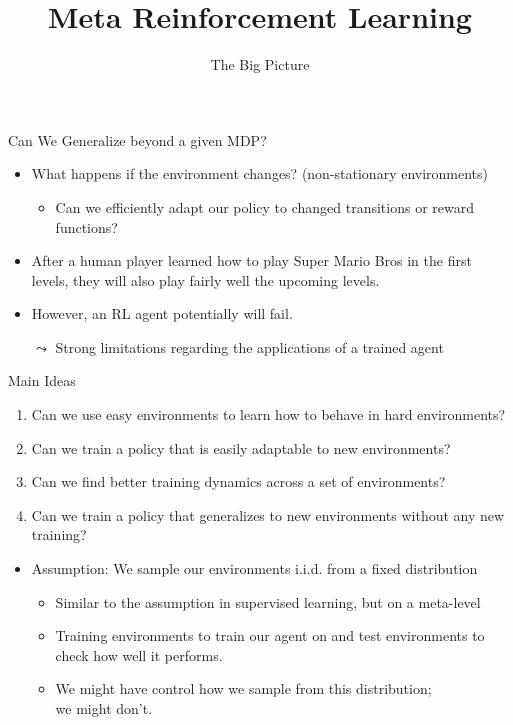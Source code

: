 \documentclass[aspectratio=169]{../latex_main/tntbeamer}  %
\title[Meta-RL]{Meta Reinforcement Learning}
\subtitle{The Big Picture}
\begin{document}
	
	\maketitle

\begin{frame}[c]{Can We Generalize beyond a given MDP?}
	
	\begin{itemize}
		\item What happens if the environment changes? (non-stationary environments)
		\begin{itemize}
			\item Can we efficiently adapt our policy to changed transitions or reward functions?
		\end{itemize}
		\smallskip
		\item After a human player learned how to play Super Mario Bros in the first levels, they will also play fairly well the upcoming levels.
		\item However, an RL agent potentially will fail.
		\item[$\leadsto$] Strong limitations regarding the applications of a trained agent
	\end{itemize}
	
\end{frame}
\begin{frame}[c]{Main Ideas}
	
	\begin{enumerate}
		\item Can we use easy environments to learn how to behave in hard environments?
		\pause
		\item Can we train a policy that is easily adaptable to new environments?
		\pause
		\item Can we find better training dynamics across a set of environments?
		\pause
		\item Can we train a policy that generalizes to new environments without any new training?
	\end{enumerate}

	\begin{itemize}
		\item Assumption: We sample our environments i.i.d. from a fixed distribution
		\begin{itemize}
			\item Similar to the assumption in supervised learning, but on a meta-level
			\item Training environments to train our agent on and test environments to check how well it performs.
			\item We might have control how we sample from this distribution;\\ we might don't.
		\end{itemize}
	\end{itemize}
			
\end{frame}
\end{document}
